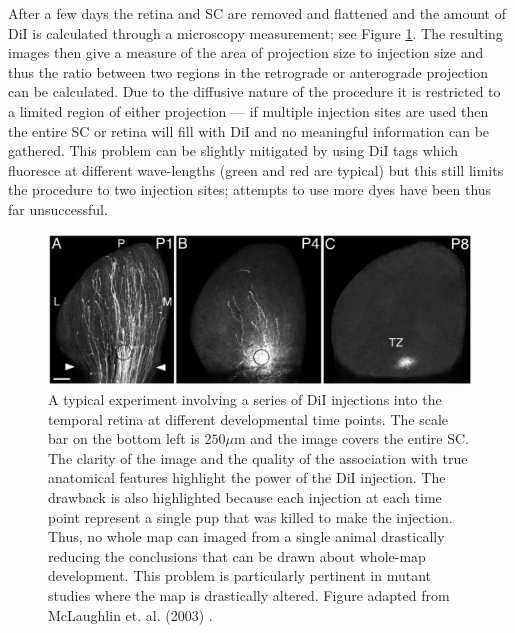 After a few days the retina and SC are removed and flattened and the amount of DiI is calculated through a microscopy measurement; see Figure \ref{fig:dii}. The resulting images then give a measure of the area of projection size to injection size and thus the ratio between two regions in the retrograde or anterograde projection can be calculated. Due to the diffusive nature of the procedure it is restricted to a limited region of either projection --- if multiple injection sites are used then the entire SC or retina will fill with DiI and no meaningful information can be gathered. This problem can be slightly mitigated by using DiI tags which fluoresce at different wave-lengths (green and red are typical) but this still limits the procedure to two injection sites; attempts to use more dyes have been thus far unsuccessful.

\begin{figure}[h!]
	\centering
	\includegraphics[width = \textwidth]{images/introduction/dii}
	\def\c{A typical experiment involving a series of DiI injections into the temporal retina at different developmental time points. }
	\caption[\c]{\label{fig:dii} \c The scale bar on the bottom left is $250\mu$m and the image covers the entire SC. The clarity of the image and the quality of the association with true anatomical features highlight the power of the DiI injection. The drawback is also highlighted because each injection at each time point represent a single pup that was killed to make the injection. Thus, no whole map can imaged from a single animal drastically reducing the conclusions that can be drawn about whole-map development. This problem is particularly pertinent in mutant studies where the map is drastically altered. Figure adapted from McLaughlin et. al. (2003) \cite{McLaughlin2003-yy}.} 
\end{figure}
